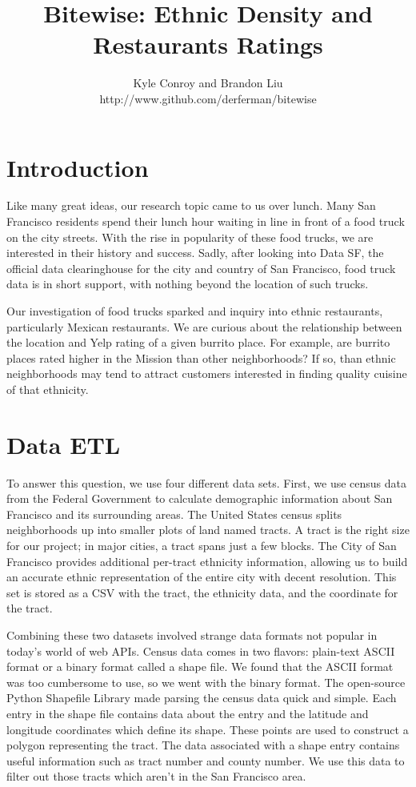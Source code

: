 \documentclass[11pt,twocolumn]{article}
\author{Kyle Conroy and Brandon Liu\\
http://www.github.com/derferman/bitewise}
\title{Bitewise: Ethnic Density and Restaurants Ratings}
\begin{document}
\maketitle

\section{Introduction}

Like many great ideas, our research topic came to us over lunch. Many San Francisco residents spend their lunch hour waiting in line in front of a food truck on the city streets. With the rise in popularity of these food trucks, we are interested in their history and success. Sadly, after looking into Data SF, the official data clearinghouse for the city and country of San Francisco, food truck data is in short support, with nothing beyond the location of such trucks.

Our investigation of food trucks sparked and inquiry into ethnic restaurants, particularly Mexican restaurants. We are curious about the relationship between the location and Yelp rating of a given burrito place. For example, are burrito places rated higher in the Mission than other neighborhoods? If so, than ethnic neighborhoods may tend to attract customers interested in finding quality cuisine of that ethnicity.

\section{Data ETL}

To answer this question, we use four different data sets. First, we use census data from the Federal Government to calculate demographic information about San Francisco and its surrounding areas. The United States census splits neighborhoods up into smaller plots of land named tracts. A tract is the right size for our project; in major cities, a tract spans just a few blocks. The City of San Francisco provides additional per-tract ethnicity information, allowing us to build an accurate ethnic representation of the entire city with decent resolution. This set is stored as a CSV with the tract, the ethnicity data, and the coordinate for the tract.

Combining these two datasets involved strange data formats not popular in today's world of web APIs. Census data comes in two flavors: plain-text ASCII format or a binary format called a shape file. We found that the ASCII format was too cumbersome to use, so we went with the binary format. The open-source Python Shapefile Library made parsing the census data quick and simple. Each entry in the shape file contains data about the entry and the latitude and longitude coordinates which define its shape. These points are used to construct a polygon representing the tract. The data associated with a shape entry contains useful information such as tract number and county number. We use this data to filter out those tracts which aren't in the San Francisco area.
\end{document}
